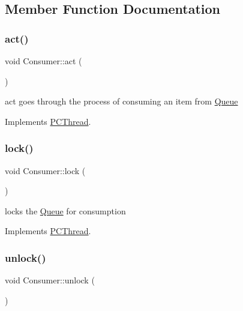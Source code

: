 \subsection{Member Function Documentation}
\mbox{\label{class_consumer_a759bbf618e780c1cca3f7a5136d3c910}} 
\subsubsection{\texorpdfstring{act()}{act()}}
{\footnotesize\ttfamily void Consumer\+::act (\begin{DoxyParamCaption}{ }\end{DoxyParamCaption})\hspace{0.3cm}{\ttfamily [virtual]}}

act goes through the process of consuming an item from \hyperlink{class_queue}{Queue} 

Implements \hyperlink{class_p_c_thread}{P\+C\+Thread}.

\mbox{\label{class_consumer_a58ab6de26dfe34d59c0522fff19f1abf}} 
\subsubsection{\texorpdfstring{lock()}{lock()}}
{\footnotesize\ttfamily void Consumer\+::lock (\begin{DoxyParamCaption}{ }\end{DoxyParamCaption})\hspace{0.3cm}{\ttfamily [virtual]}}

locks the \hyperlink{class_queue}{Queue} for consumption 

Implements \hyperlink{class_p_c_thread}{P\+C\+Thread}.

\mbox{\label{class_consumer_acf783a2789b071a237f7759ccf6bacaf}} 
\subsubsection{\texorpdfstring{unlock()}{unlock()}}
{\footnotesize\ttfamily void Consumer\+::unlock (\begin{DoxyParamCaption}{ }\end{DoxyParamCaption})\hspace{0.3cm}{\ttfamily [virtual]}}

